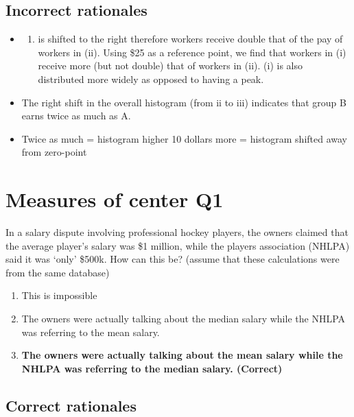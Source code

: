 \documentclass[letterpaper,10pt,twoside,printwatermark=false]{pinp}
\providecommand{\tightlist}{%
  \setlength{\itemsep}{0pt}\setlength{\parskip}{0pt}}
\begin{document}
\subsection{Incorrect rationales}\label{incorrect-rationales-4}

\begin{itemize}
\item
  \begin{enumerate}
  \def\labelenumi{(\roman{enumi})}
  \setcounter{enumi}{2}
  \tightlist
  \item
    is shifted to the right therefore workers receive double that of the
    pay of workers in (ii). Using \$25 as a reference point, we find
    that workers in (i) receive more (but not double) that of workers in
    (ii). (i) is also distributed more widely as opposed to having a
    peak.
  \end{enumerate}
\item
  The right shift in the overall histogram (from ii to iii) indicates
  that group B earns twice as much as A.
\item
  Twice as much = histogram higher 10 dollars more = histogram shifted
  away from zero-point
\end{itemize}

\section{Measures of center Q1}\label{measures-of-center-q1}

In a salary dispute involving professional hockey players, the owners
claimed that the average player's salary was \$1 million, while the
players association (NHLPA) said it was `only' \$500k. How can this be?
(assume that these calculations were from the same database)

\begin{enumerate}
\def\labelenumi{\alph{enumi})}
\tightlist
\item
  This is impossible
\item
  The owners were actually talking about the median salary while the
  NHLPA was referring to the mean salary.
\item
  \textbf{The owners were actually talking about the mean salary while
  the NHLPA was referring to the median salary. (Correct)}
\end{enumerate}

\subsection{Correct rationales}\label{correct-rationales-5}
\end{document}
